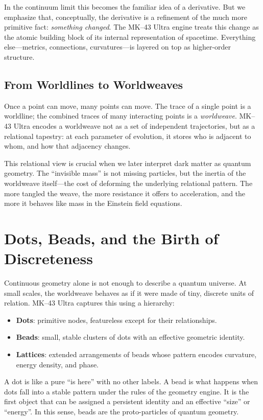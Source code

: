 In the continuum limit this becomes the familiar idea of a derivative. But we
emphasize that, conceptually, the derivative is a refinement of the much more
primitive fact: \emph{something changed}. The MK--43 Ultra engine treats this
change as the atomic building block of its internal representation of
spacetime. Everything else---metrics, connections, curvatures---is layered on
top as higher-order structure.

\section{From Worldlines to Worldweaves}
Once a point can move, many points can move. The trace of a single point is a
worldline; the combined traces of many interacting points is a
\emph{worldweave}. MK--43 Ultra encodes a worldweave not as a set of
independent trajectories, but as a relational tapestry: at each parameter of
evolution, it stores who is adjacent to whom, and how that adjacency changes.

This relational view is crucial when we later interpret dark matter as quantum
geometry. The ``invisible mass'' is not missing particles, but the inertia of
the worldweave itself---the cost of deforming the underlying relational
pattern. The more tangled the weave, the more resistance it offers to
acceleration, and the more it behaves like mass in the Einstein field
equations.

\chapter{Dots, Beads, and the Birth of Discreteness}
Continuous geometry alone is not enough to describe a quantum universe. At
small scales, the worldweave behaves as if it were made of tiny, discrete
units of relation. MK--43 Ultra captures this using a hierarchy:

\begin{itemize}
  \item \textbf{Dots}: primitive nodes, featureless except for their
  relationships.
  \item \textbf{Beads}: small, stable clusters of dots with an effective
  geometric identity.
  \item \textbf{Lattices}: extended arrangements of beads whose pattern
  encodes curvature, energy density, and phase.
\end{itemize}

A dot is like a pure ``is here'' with no other labels. A bead is what happens
when dots fall into a stable pattern under the rules of the geometry engine. It
is the first object that can be assigned a persistent identity and an effective
``size'' or ``energy''. In this sense, beads are the proto-particles of quantum
geometry.

